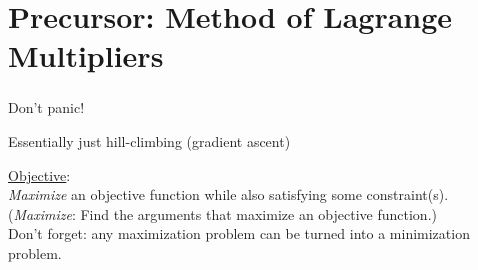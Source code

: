 \section{Precursor: Method of Lagrange Multipliers}


\begin{frame}\frametitle{\secname} 
    \begin{center}
    \slidesonly{\huge}
	Don't panic!
    \end{center}
    \begin{center}
        Essentially just hill-climbing (gradient ascent)
    \end{center}
    \pause

\underline{Objective}: \\
\textit{Maximize} an objective function while also satisfying some constraint(s).\\
{
\small(\textit{Maximize}: Find the arguments that maximize an objective function.)
}\\[5mm]
Don't forget: any maximization problem can be turned into a minimization problem.
\end{frame}

